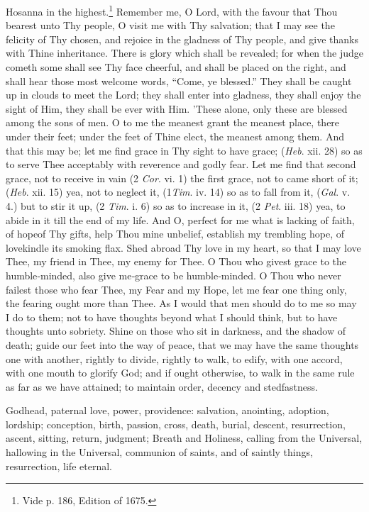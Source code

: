 
Hosanna in the highest.\footnote{Vide p. 186, Edition of 1675.} Remember me, O Lord, with the favour that Thou bearest unto Thy people, O visit me with Thy salvation; that I may see the felicity of Thy chosen,  and rejoice in the gladness of Thy people, and give thanks with Thine inheritance. There is glory which shall be revealed; for when the judge cometh some shall see Thy face cheerful, and shall be placed on the right, and shall hear those most welcome words, ``Come, ye blessed.'' They shall be caught up in clouds to meet the Lord; they shall enter into gladness, they shall enjoy the sight of Him, they shall be ever with Him. 'These alone, only these are blessed among the sons of men. O to me the meanest grant the meanest place, there under their feet; under the feet of Thine elect, the meanest among them. And that this may be;  let me find grace in Thy sight to have grace; (\emph{Heb}. xii. 28) so as to serve Thee acceptably with reverence and godly fear.  Let me find that second grace, not to receive in vain (2 \emph{Cor}. vi. 1) the first grace, not to came short of it; (\emph{Heb}. xii. 15) yea, not to neglect it, (1\emph{Tim}. iv. 14) so as to fall from it, (\emph{Gal}. v. 4.) but to stir it up, (2 \emph{Tim}. i. 6) so as to increase in it, (2 \emph{Pet}. iii. 18) yea, to abide in it till the end of my life. And O, perfect for me what is lacking of faith, of hopeof Thy gifts, help Thou mine unbelief, establish my trembling hope,  of lovekindle its smoking flax. Shed abroad Thy love in my heart, so that I may love Thee, my friend in Thee, my enemy for Thee. O Thou who givest grace to the humble‑minded, also give me‑grace to be humble‑minded. O Thou who never failest those who fear Thee, my Fear and my Hope, let me fear one thing only, the fearing ought more than Thee. As I would that men should do to me so may I do to them; not to have thoughts beyond what I should think, but to have thoughts unto sobriety. Shine on those who sit in darkness, and the shadow of death; guide our feet into the way of peace, that we may have the same thoughts one with another, rightly to divide, rightly to walk, to edify, with one accord, with one mouth to glorify God; and if ought otherwise, to walk in the same rule as far as we have attained; to maintain order, decency and stedfastness.


Godhead, paternal love, power, providence: salvation, anointing, adoption, lordship;  conception, birth, passion, cross, death, burial, descent, resurrection, ascent, sitting, return, judgment; Breath and Holiness, calling from the Universal, hallowing in the Universal, communion of saints, and of saintly things, resurrection, life eternal.

